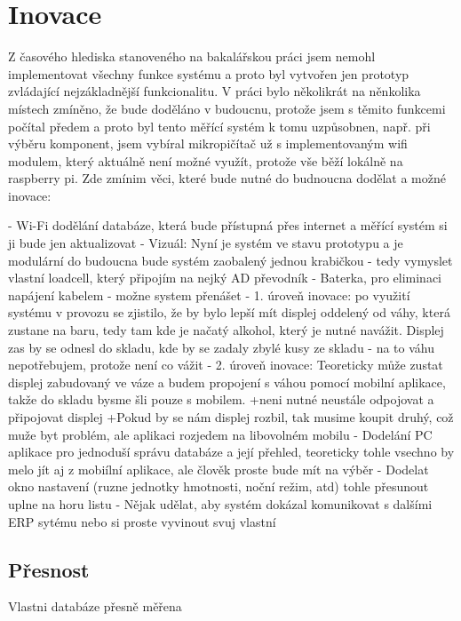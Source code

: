 

\chapter{Inovace}
Z časového hlediska stanoveného na bakalářskou práci jsem nemohl implementovat všechny funkce systému a proto byl vytvořen jen prototyp zvládající nejzákladnější funkcionalitu.
V práci bylo několikrát na něnkolika místech zmíněno, že bude doděláno v budoucnu, protože jsem s těmito funkcemi počítal předem a proto byl tento měřící systém k tomu uzpůsobnen, např. při výběru komponent, jsem vybíral mikropičítač už s implementovaným wifi modulem, který aktuálně není možné využít, protože vše běží lokálně na raspberry pi.
Zde zmínim věci, které bude nutné do budnoucna dodělat a možné inovace:

- Wi-Fi dodělání databáze, která bude přístupná přes internet a měřící systém si ji bude jen aktualizovat
- Vizuál: Nyní je systém ve stavu prototypu a je modulární do budoucna bude systém zaobalený jednou krabičkou - tedy vymyslet vlastní loadcell, který připojím na nejký AD převodník
- Baterka, pro eliminaci napájení kabelem - možne system přenášet 
- 1. úroveň inovace: po využití systému v provozu se zjistilo, že by bylo lepší mít displej oddelený od váhy, která zustane na baru, tedy tam kde je načatý alkohol, který je nutné navážit. Displej zas by se odnesl do skladu, kde by se zadaly zbylé kusy ze skladu - na to váhu nepotřebujem, protože není co vážit
- 2. úroveň inovace: Teoreticky může zustat displej zabudovaný ve váze a budem propojení s váhou pomocí mobilní aplikace, takže do skladu bysme šli pouze s mobilem.
    +neni nutné neustále odpojovat a připojovat displej
    +Pokud by se nám displej rozbil, tak musime koupit druhý, což muže byt problém, ale aplikaci rozjedem na libovolném mobilu
- Dodelání PC aplikace pro jednoduší správu databáze a její přehled, teoreticky tohle vsechno by melo jít aj z mobiílní aplikace, ale člověk proste bude mít na výběr 
- Dodelat okno nastavení (ruzne jednotky hmotnosti, noční režim, atd) tohle přesunout uplne na horu listu
- Nějak udělat, aby systém dokázal komunikovat s dalšími ERP sytému nebo si proste vyvinout svuj vlastní

\section{Přesnost}
Vlastni databáze přesně měřena

